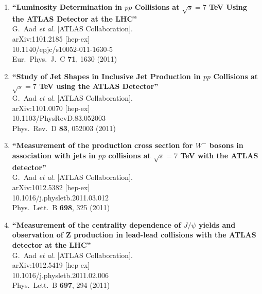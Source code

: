 \documentclass{article}
\begin{document}
\begin{enumerate}
\item%
{\bf ``Luminosity Determination in $pp$ Collisions at $\sqrt{s}=7$ TeV Using the ATLAS Detector at the LHC''}
  \\{}G.~Aad {\it et al.}  [ATLAS Collaboration].
  \\{}arXiv:1101.2185 [hep-ex]
    \\{}10.1140/epjc/s10052-011-1630-5
\\{}Eur.\ Phys.\ J.\ C {\bf 71}, 1630 (2011) %


\item%
{\bf ``Study of Jet Shapes in Inclusive Jet Production in $pp$ Collisions at $\sqrt{s}=7$ TeV using the ATLAS Detector''}
  \\{}G.~Aad {\it et al.}  [ATLAS Collaboration].
  \\{}arXiv:1101.0070 [hep-ex]
    \\{}10.1103/PhysRevD.83.052003
\\{}Phys.\ Rev.\ D {\bf 83}, 052003 (2011) %


\item%
{\bf ``Measurement of the production cross section for $W^-$ bosons in association with jets in $pp$ collisions at $\sqrt{s}=7$ TeV with the ATLAS detector''}
  \\{}G.~Aad {\it et al.}  [ATLAS Collaboration].
  \\{}arXiv:1012.5382 [hep-ex]
    \\{}10.1016/j.physletb.2011.03.012
\\{}Phys.\ Lett.\ B {\bf 698}, 325 (2011) %


\item%
{\bf ``Measurement of the centrality dependence of $J/{\psi}$ yields and observation of Z production in lead-lead collisions with the ATLAS detector at the LHC''}
  \\{}G.~Aad {\it et al.}  [ATLAS Collaboration].
  \\{}arXiv:1012.5419 [hep-ex]
    \\{}10.1016/j.physletb.2011.02.006
\\{}Phys.\ Lett.\ B {\bf 697}, 294 (2011) %



\end{enumerate}
\end{document}
